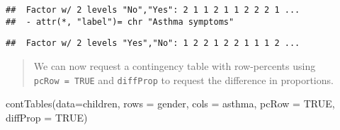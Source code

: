\documentclass[
]{memoir}
\newenvironment{Shaded}{\begin{snugshade}}{\end{snugshade}}
\newcommand{\AttributeTok}[1]{\textcolor[rgb]{0.77,0.63,0.00}{#1}}
\newcommand{\ConstantTok}[1]{\textcolor[rgb]{0.00,0.00,0.00}{#1}}
\newcommand{\FunctionTok}[1]{\textcolor[rgb]{0.00,0.00,0.00}{#1}}
\newcommand{\NormalTok}[1]{#1}
\newcommand{\OtherTok}[1]{\textcolor[rgb]{0.56,0.35,0.01}{#1}}
\newcommand{\SpecialCharTok}[1]{\textcolor[rgb]{0.00,0.00,0.00}{#1}}
\newcommand{\StringTok}[1]{\textcolor[rgb]{0.31,0.60,0.02}{#1}}
\begin{document}
\begin{verbatim}
##  Factor w/ 2 levels "No","Yes": 2 1 1 2 1 1 2 2 2 1 ...
##  - attr(*, "label")= chr "Asthma symptoms"
\end{verbatim}

\begin{Shaded}
\end{Shaded}

\begin{verbatim}
##  Factor w/ 2 levels "Yes","No": 1 2 2 1 2 2 1 1 1 2 ...
\end{verbatim}

\begin{quote}
We can now request a contingency table with row-percents using \texttt{pcRow\ =\ TRUE} and \texttt{diffProp} to request the difference in proportions.
\end{quote}

\begin{Shaded}
\begin{Highlighting}[]
\FunctionTok{contTables}\NormalTok{(}\AttributeTok{data=}\NormalTok{children, }\AttributeTok{rows =}\NormalTok{ gender, }\AttributeTok{cols =}\NormalTok{ asthma,}
           \AttributeTok{pcRow =} \ConstantTok{TRUE}\NormalTok{, }\AttributeTok{diffProp =} \ConstantTok{TRUE}\NormalTok{)}
\end{Highlighting}
\end{Shaded}
\end{document}
